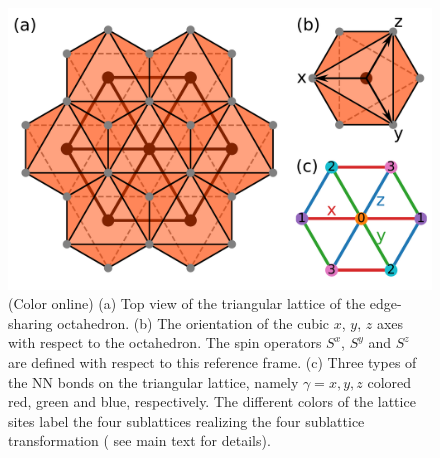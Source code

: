 \documentclass[aps,prb,reprint,amsfonts,amsmath,amssymb,showpacs,groupedaddress,superscriptaddress]{revtex4-1}
\begin{document}
\begin{figure}
    \centering
    \includegraphics[width=\columnwidth]{fig/ModelDefinition.pdf}
    \caption{\label{fig:ModelDefinition}(Color online) (a) Top view of the triangular lattice of the edge-sharing octahedron. (b) The orientation of the cubic $x$, $y$, $z$ axes with respect to the octahedron. The spin operators $S^x$, $S^y$ and $S^z$ are defined with respect to this reference frame. (c) Three types of the NN bonds on the triangular lattice, namely $\gamma=x, y, z$ colored red, green and blue, respectively. The different colors of the lattice sites label the four sublattices realizing the four sublattice transformation ( see main text for details).}
\end{figure}
\end{document}
